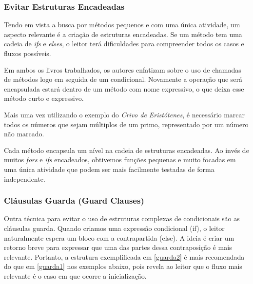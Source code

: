 

\subsubsection{Evitar Estruturas Encadeadas}
Tendo em vista a busca por métodos pequenos e com uma única atividade, um aspecto relevante é a criação de estruturas encadeadas. Se um método tem uma cadeia de \textit{ifs} e \textit{elses}, o leitor terá dificuldades para compreender todos os casos e fluxos possíveis.
	
Em ambos os livros trabalhados, os autores enfatizam sobre o uso de chamadas de métodos logo em seguida de um condicional. Novamente a operação que será encapsulada estará dentro de um método com nome expressivo, o que deixa esse método curto e expressivo.
	
Mais uma vez utilizando o exemplo do \textit{Crivo de Eristótenes}, é necessário marcar todos os números que sejam múltiplos de um primo, representado por um número não marcado.



Cada método encapsula um nível na cadeia de estruturas encadeadas. Ao invés de muitos \textit{fors} e \textit{ifs} encadeados, obtivemos funções pequenas e muito focadas em uma única atividade que podem ser mais facilmente testadas de forma independente.

\subsubsection{Cláusulas Guarda (Guard Clauses)}
Outra técnica para evitar o uso de estruturas complexas de condicionais são as cláusulas guarda. Quando criamos uma expressão condicional (if), o leitor naturalmente espera um bloco com a contrapartida (else). A ideia é criar um retorno breve para expressar que uma das partes dessa contraposição é mais relevante. Portanto, a estrutura exemplificada em \ref{guarda2} é mais recomendada do que em \ref{guarda1} nos exemplos abaixo, pois revela ao leitor que o fluxo mais relevante é o caso em que ocorre a inicialização.





